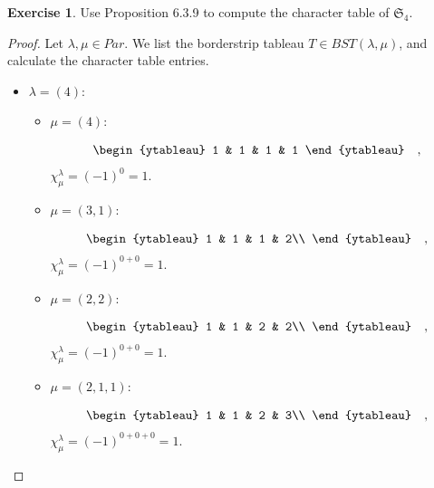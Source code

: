 \documentclass[8pt]{extarticle}
\newcommand{\<}{\langle}
\renewcommand{\>}{\rangle}
\theoremstyle{definition}
\newtheorem{exercise}{Exercise}
\begin{document}
\newpage
\begin{exercise}
  Use Proposition 6.3.9 to compute the character table of $\mathfrak{S}_4$.
\end{exercise}
\begin{proof}
  Let $\lambda, \mu \in Par$. We list the borderstrip tableau $T \in BST(\lambda, \mu)$, and calculate the character table entries.

  \begin{itemize}
  \item
    $\lambda=(4)$:
    \begin{itemize}
    \item
      $\mu = (4)$:
      
      \begin{align*}
        \begin{ytableau}
          1 & 1 & 1 & 1
        \end{ytableau}\quad,
      \end{align*}
      $\chi_{\mu}^{\lambda} = (-1)^0 = 1$.

    \item
      $\mu = (3,1)$:

      \begin{align*}
        \begin{ytableau}
          1 & 1 & 1 & 2\\
        \end{ytableau}\quad,
      \end{align*}
      $\chi_{\mu}^{\lambda} = (-1)^{0+0} = 1$.

    \item
      $\mu = (2,2)$:

      \begin{align*}
        \begin{ytableau}
          1 & 1 & 2 & 2\\
        \end{ytableau}\quad,
      \end{align*}
      $\chi_{\mu}^{\lambda} = (-1)^{0+0} = 1$.    

    \item
      $\mu = (2,1,1)$:

      \begin{align*}
        \begin{ytableau}
          1 & 1 & 2 & 3\\
        \end{ytableau}\quad,
      \end{align*}
      $\chi_{\mu}^{\lambda} = (-1)^{0+0+0} = 1$.


\end{itemize}
\end{itemize}
\end{proof}
\end{document}
